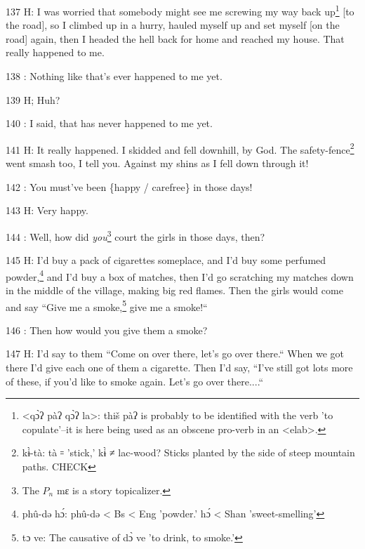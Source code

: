 137 H: I was worried that somebody might see me screwing my way back up\footnote{<qɔ̀ʔ pàʔ qɔ̀ʔ la>: thiš pàʔ is probably to be identified with the verb 'to copulate'--it is here being used as an obscene pro-verb in an <elab>.} [to
the road], so I climbed up in a hurry, hauled myself up and set myself [on the
road] again, then I headed the hell back for home and reached my house. That really
happened to me.

138  : Nothing like that's ever happened to me yet.

139 H; Huh?

140  : I said, that has never happened to me yet.

141 H: It really happened. I skidded and fell downhill, by God. The safety-fence\footnote{kɨ̀-tà: tà ꞊ 'stick,' kɨ̀ ≠ lac-wood? Sticks planted by the side of steep mountain paths. CHECK}
went smash too, I tell you. Against my shins as I fell down through it!

142  : You must've been \{happy / carefree\} in those days!

143 H: Very happy.

144  : Well, how did \textit{you}\footnote{The $P_n$ mɛ is a story topicalizer.} court the girls in those days, then?

145 H: I'd buy a pack of cigarettes someplace, and I'd buy some perfumed powder,\footnote{phû-də hɔ́: phû-də < Bs < Eng 'powder.' hɔ́ < Shan 'sweet-smelling'}
and I'd buy a box of matches, then I'd go scratching my matches down in the middle
of the village, making big red flames. Then the girls would come and say ``Give
me a smoke,\footnote{tɔ ve: The causative of dɔ̀ ve 'to drink, to smoke.'} give me a smoke!``

146  : Then how would you give them a smoke?

147 H: I'd say to them ``Come on over there, let's go over there.``
When we got there I'd give each one of them a cigarette. Then I'd say, ``I've
still got lots more of these, if you'd like to smoke again. Let's go over there....``

